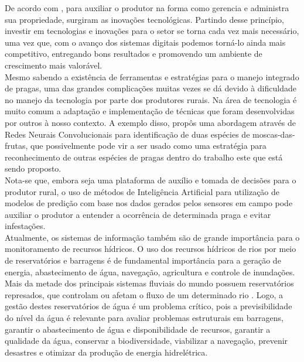 \documentclass[tcc-proposta]{texufpel}
\begin{document}
De acordo com \citet{Canuto:2012}, para auxiliar o produtor na forma como gerencia e administra sua
propriedade, surgiram as inovações tecnológicas. Partindo desse princípio, investir em tecnologias e inovações para o setor se torna cada vez mais necessário, uma vez que, com o avanço dos sistemas digitais podemos torná-lo ainda mais competitivo, entregando bons resultados e promovendo um ambiente de crescimento mais valorável.
\\


Mesmo sabendo a existência de ferramentas e estratégias para o manejo integrado de pragas, uma das grandes complicações muitas vezes se dá devido à dificuldade no manejo da tecnologia por parte dos produtores rurais. Na área de tecnologia é muito comum a adaptação e implementação de técnicas que foram desenvolvidas por outros à nosso contexto. A exemplo disso, \citet{Valter:Lucas:2019} propôs uma abordagem através de Redes Neurais Convolucionais para identificação de duas espécies de moscas-das-frutas, que possivelmente pode vir a ser usado como uma estratégia para reconhecimento de outras espécies de pragas dentro do trabalho este que está sendo proposto.
\\

Nota-se que, embora seja uma plataforma de auxílio e tomada de decisões para o produtor rural, o uso de métodos de Inteligência Artificial para utilização de modelos de predição com base nos dados gerados pelos sensores em campo pode auxiliar o produtor a entender a ocorrência de determinada praga e evitar infestações. 
\\

Atualmente, os sistemas de informação também são de grande importância para o monitoramento de recursos hídricos. O uso dos recursos hídricos de rios por meio de reservatórios e barragens é de fundamental importância para a geração de energia, abastecimento de água, navegação, agricultura e controle de inundações. Mais da metade dos principais sistemas fluviais do mundo possuem reservatórios represados, que controlam ou afetam o fluxo de um determinado rio \citet{Joo:2015}. Logo, a gestão destes reservatórios de água é um problema crítico, pois a previsibilidade do nível da água é relevante para avaliar problemas estruturais em barragens, garantir o abastecimento de água e disponibilidade de recursos, garantir a qualidade da água, conservar a biodiversidade, viabilizar a navegação, prevenir desastres e otimizar da produção de energia hidrelétrica.
\\
\end{document}
